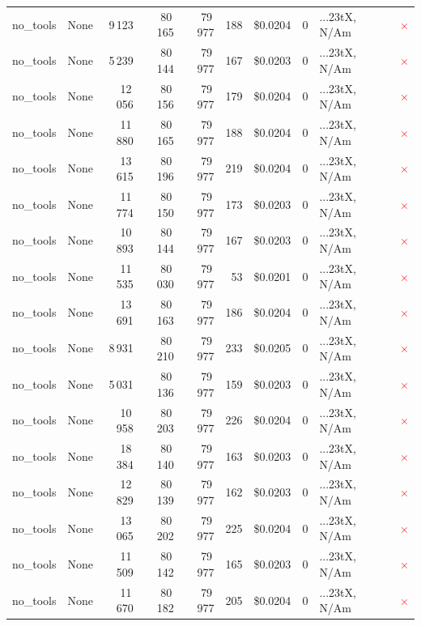\documentclass[a4paper,11pt]{article}
\begin{document}
\begin{table}[H]
{\begin{tabular}{l r r r r r r r l c}
no\_tools & None & 9\,123 & 80\,165 & 79\,977 & 188 & \$0.0204 & 0 & ...23tX, N/Am & \textcolor{red}{\(\times\)} \\
no\_tools & None & 5\,239 & 80\,144 & 79\,977 & 167 & \$0.0203 & 0 & ...23tX, N/Am & \textcolor{red}{\(\times\)} \\
no\_tools & None & 12\,056 & 80\,156 & 79\,977 & 179 & \$0.0204 & 0 & ...23tX, N/Am & \textcolor{red}{\(\times\)} \\
no\_tools & None & 11\,880 & 80\,165 & 79\,977 & 188 & \$0.0204 & 0 & ...23tX, N/Am & \textcolor{red}{\(\times\)} \\
no\_tools & None & 13\,615 & 80\,196 & 79\,977 & 219 & \$0.0204 & 0 & ...23tX, N/Am & \textcolor{red}{\(\times\)} \\
no\_tools & None & 11\,774 & 80\,150 & 79\,977 & 173 & \$0.0203 & 0 & ...23tX, N/Am & \textcolor{red}{\(\times\)} \\
no\_tools & None & 10\,893 & 80\,144 & 79\,977 & 167 & \$0.0203 & 0 & ...23tX, N/Am & \textcolor{red}{\(\times\)} \\
no\_tools & None & 11\,535 & 80\,030 & 79\,977 & 53 & \$0.0201 & 0 & ...23tX, N/Am & \textcolor{red}{\(\times\)} \\
no\_tools & None & 13\,691 & 80\,163 & 79\,977 & 186 & \$0.0204 & 0 & ...23tX, N/Am & \textcolor{red}{\(\times\)} \\
no\_tools & None & 8\,931 & 80\,210 & 79\,977 & 233 & \$0.0205 & 0 & ...23tX, N/Am & \textcolor{red}{\(\times\)} \\
no\_tools & None & 5\,031 & 80\,136 & 79\,977 & 159 & \$0.0203 & 0 & ...23tX, N/Am & \textcolor{red}{\(\times\)} \\
no\_tools & None & 10\,958 & 80\,203 & 79\,977 & 226 & \$0.0204 & 0 & ...23tX, N/Am & \textcolor{red}{\(\times\)} \\
no\_tools & None & 18\,384 & 80\,140 & 79\,977 & 163 & \$0.0203 & 0 & ...23tX, N/Am & \textcolor{red}{\(\times\)} \\
no\_tools & None & 12\,829 & 80\,139 & 79\,977 & 162 & \$0.0203 & 0 & ...23tX, N/Am & \textcolor{red}{\(\times\)} \\
no\_tools & None & 13\,065 & 80\,202 & 79\,977 & 225 & \$0.0204 & 0 & ...23tX, N/Am & \textcolor{red}{\(\times\)} \\
no\_tools & None & 11\,509 & 80\,142 & 79\,977 & 165 & \$0.0203 & 0 & ...23tX, N/Am & \textcolor{red}{\(\times\)} \\
no\_tools & None & 11\,670 & 80\,182 & 79\,977 & 205 & \$0.0204 & 0 & ...23tX, N/Am & \textcolor{red}{\(\times\)} \\

\end{tabular}}
\end{table}
\end{document}
